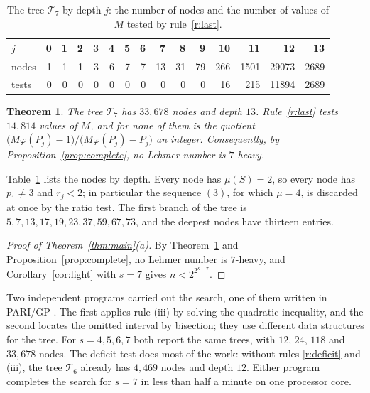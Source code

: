 \documentclass[11pt,reqno]{amsart}
\numberwithin{equation}{section}
\theoremstyle{plain}
\newtheorem{theorem}{Theorem}[section]
\theoremstyle{definition}
\theoremstyle{remark}
\begin{document}
\begin{table}[t]
\centering
\caption{The tree $\mathcal T_7$ by depth $j$: the number of nodes and
the number of values of $M$ tested by rule~\ref{r:last}.}
\label{tab:depth}
\small
\begin{tabular}{@{}l*{14}{r}@{}}
\toprule
$j$ & 0 & 1 & 2 & 3 & 4 & 5 & 6 & 7 & 8 & 9 & 10 & 11 & 12 & 13\\
\midrule
nodes & 1 & 1 & 1 & 3 & 6 & 7 & 7 & 13 & 31 & 79 & 266 & 1501 & 29073 & 2689\\
tests & 0 & 0 & 0 & 0 & 0 & 0 & 0 & 0 & 0 & 0 & 16 & 215 & 11894 & 2689\\
\bottomrule
\end{tabular}
\end{table}

\begin{theorem}\label{thm:search}
The tree $\mathcal T_7$ has $33{,}678$ nodes and depth $13$.
Rule~\ref{r:last} tests $14{,}814$ values of $M$, and for none of them
is the quotient $\bigl(M\varphi(P_j)-1\bigr)/\bigl(M\varphi(P_j)-P_j\bigr)$
an integer. Consequently, by Proposition~\ref{prop:complete}, no
Lehmer number is $7$-heavy.
\end{theorem}

Table~\ref{tab:depth} lists the nodes by depth. Every node has
$\mu(S)=2$, so every node has $p_1\ne3$ and $r_j<2$; in particular the
sequence $(3)$, for which $\mu=4$, is discarded at once by the ratio
test. The first branch of the tree is
$5,7,13,17,19,23,37,59,67,73$, and the deepest nodes have thirteen
entries.

\begin{proof}[Proof of Theorem~\textup{\ref{thm:main}(a)}]
By Theorem~\ref{thm:search} and Proposition~\ref{prop:complete}, no
Lehmer number is $7$-heavy, and Corollary~\ref{cor:light} with $s=7$
gives $n<2^{2^{k-7}}$.
\end{proof}

Two independent programs carried out the search, one of them written
in PARI/GP \cite{PARI}. The first applies rule (iii) by solving the
quadratic inequality, and the second locates the omitted interval by
bisection; they use different data structures for the tree. For
$s=4,5,6,7$ both report the same trees, with $12$, $24$, $118$ and
$33{,}678$ nodes. The deficit test does most of the work: without
rules \ref{r:deficit} and (iii), the tree $\mathcal T_6$ already has
$4{,}469$ nodes and depth $12$. Either program completes the search
for $s=7$ in less than half a minute on one processor core.
\end{document}
